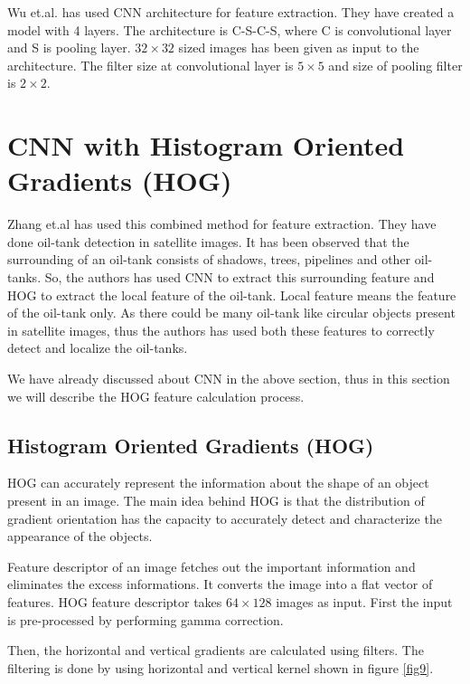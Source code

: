 \par Wu et.al. \cite{b5} has used CNN architecture for feature extraction. They have created a model with 4 layers. The architecture is C-S-C-S, where C is convolutional layer and S is pooling layer. $32\times 32$ sized images has been given as input to the architecture. The filter size at convolutional layer is $5\times 5$ and size of pooling filter is $2\times 2$.


\section{CNN with Histogram Oriented Gradients (HOG)}
Zhang et.al \cite{b6} has used this combined method for feature extraction. They have done oil-tank detection in satellite images. It has been observed that the surrounding of an oil-tank consists of shadows, trees, pipelines and other oil-tanks. So, the authors has used CNN to extract this surrounding feature and HOG to extract the local feature of the oil-tank. Local feature means the feature of the oil-tank only. As there could be many oil-tank like circular objects present in satellite images, thus the authors has used both these features to correctly detect and localize the oil-tanks. 
\par We have already discussed about CNN in the above section, thus in this section we will describe the HOG feature calculation process.
\subsection{Histogram Oriented Gradients (HOG)}
HOG can accurately represent the information about the shape of an object present in an image. The main idea behind HOG is that the distribution of gradient orientation has the capacity to accurately detect and characterize the appearance of the objects. 
\par Feature descriptor of an image fetches out the important information and eliminates the excess informations. It converts the image into a flat vector of features. HOG \cite{b7} feature descriptor takes $64\times 128$ images as input. First the input is pre-processed by performing gamma correction. 
\par Then, the horizontal and vertical gradients are calculated using filters. The filtering is done by using horizontal and vertical kernel shown in figure \ref{fig9}.


